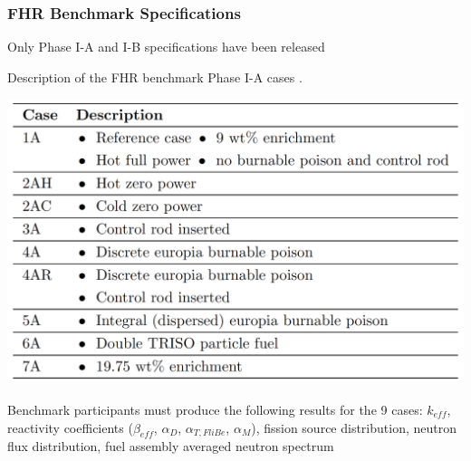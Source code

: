 \begin{frame}
    \frametitle{FHR Benchmark Specifications}
    Only Phase I-A and I-B specifications have been released 
    \begin{table}
        \caption{Description of the \acrlong{FHR} benchmark Phase I-A cases 
        \vspace{-0.25cm}
        \cite{petrovic_benchmark_2021}.}
        \includegraphics[width=0.8\linewidth]{figures/benchmark-cases.png} 
    \end{table}
    Benchmark participants must produce the following results for 
    the 9 cases: $k_{eff}$, reactivity coefficients ($\beta_{eff}$, 
    $\alpha_D$, $\alpha_{T, FliBe}$, $\alpha_M$), fission source distribution, 
    neutron flux distribution, fuel assembly averaged neutron spectrum
\end{frame}


